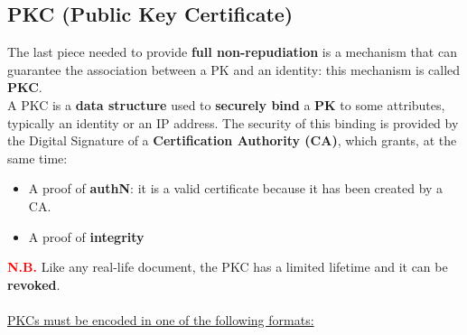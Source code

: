 \subsection{PKC (Public Key Certificate)}
The last piece needed to provide \textbf{full non-repudiation} is a mechanism that can guarantee the association between a PK and an identity: this mechanism is called \textbf{PKC}.\\  
A PKC is a \textbf{data structure} used to \textbf{securely bind} a \textbf{PK} to some attributes, typically an identity or an IP address. The security of this binding is provided by the Digital Signature
of a \textbf{Certification Authority (CA)}, which grants, at the same time:
\begin{itemize}
    \item A proof of \textbf{authN}: it is a valid certificate because it has been created by a CA.
    \item A proof of \textbf{integrity}
\end{itemize}
\textcolor{red}{\textbf{N.B.}} Like any real-life document, the PKC has a limited lifetime and it can be \textbf{revoked}.\\
\\
\underline{PKCs must be encoded in one of the following formats:}
